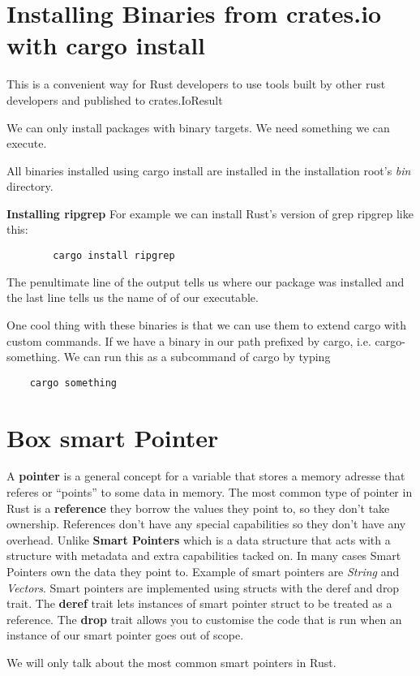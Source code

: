 \section{Installing Binaries from crates.io with cargo install}
This is a convenient way for Rust developers to use tools built by other rust developers and published to crates.IoResult

\begin{remark}
    We can only install packages with binary targets. We need something we can execute.
\end{remark}

All binaries installed using cargo install are installed in the installation root's \textit{bin} directory.

\begin{example}\textbf{Installing ripgrep}
    For example we can install Rust's version of grep ripgrep like this:\begin{lstlisting}
        cargo install ripgrep 
    \end{lstlisting}
    The penultimate line of the output tells us where our package was installed and the last line tells us the name of of our executable. 
\end{example}
One cool thing with these binaries is that we can use them to extend cargo with custom commands. If we have a binary in our path prefixed by cargo, i.e. cargo-something. We can run this as a subcommand of cargo by typing\begin{lstlisting}
    cargo something
\end{lstlisting}

\section{Box smart Pointer}
\begin{definition}
    A \textbf{pointer} is a general concept for a variable that stores a memory adresse that referes or ``points'' to some data in memory. The most common type of pointer in Rust is a \textbf{reference} they borrow the values they point to, so they don't take ownership.
    References don't have any special capabilities so they don't have any overhead. Unlike \textbf{Smart Pointers} which is a data structure that acts with a structure with metadata and extra capabilities tacked on. In many cases Smart Pointers own the data they point to. Example of smart pointers are \textit{String} and \textit{Vectors}.
    Smart pointers are implemented using structs with the deref and drop trait. The \textbf{deref} trait lets instances of smart pointer struct to be treated as a reference. The \textbf{drop} trait allows you to customise the code that is run when an instance of our smart pointer goes out of scope. 
\end{definition}
We will only talk about the most common smart pointers in Rust.

